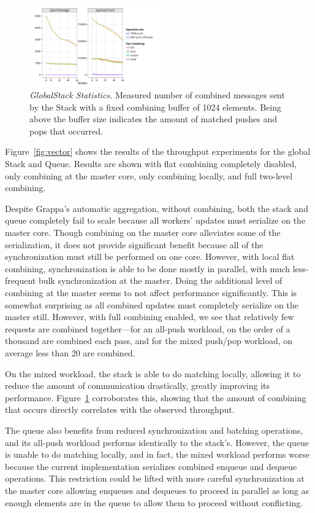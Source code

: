\begin{figure}[t]
  \centering
  \includegraphics[width=0.5\textwidth]{data/plots/stack_stats.pdf}
  \caption{\emph{GlobalStack Statistics.}
    Measured number of combined messages sent by the Stack with a fixed combining buffer of 1024 elements. Being above the buffer size indicates the amount of matched pushes and pops that occurred.
  }
  \label{fig:stack_stats}
\end{figure}

Figure~\ref{fig:vector} shows the results of the throughput experiments for the global Stack and Queue. Results are shown with flat combining completely disabled, only combining at the master core, only combining locally, and full two-level combining.

Despite Grappa's automatic aggregation, without combining, both the stack and queue completely fail to scale because all workers' updates must serialize on the master core.
Though combining on the master core alleviates some of the serialization, it does not provide significant benefit because all of the synchronization must still be performed on one core. However, with local flat combining, synchronization is able to be done mostly in parallel, with much less-frequent bulk synchronization at the master. Doing the additional level of combining at the master seems to not affect performance significantly. This is somewhat surprising as all combined updates must completely serialize on the master still. However, with full combining enabled, we see that relatively few requests are combined together---for an all-push workload, on the order of a thousand are combined each pass, and for the mixed push/pop workload, on average less than 20 are combined.

On the mixed workload, the stack is able to do matching locally, allowing it to reduce the amount of communication drastically, greatly improving its performance. Figure~\ref{fig:stack_stats} corroborates this, showing that the amount of combining that occurs directly correlates with the observed throughput.

The queue also benefits from reduced synchronization and batching operations, and its all-push workload performs identically to the stack's.
However, the queue is unable to do matching locally, and in fact, the mixed workload performs worse because the current implementation serializes combined enqueue and dequeue operations. This restriction could be lifted with more careful synchronization at the master core allowing enqueues and dequeues to proceed in parallel as long as enough elements are in the queue to allow them to proceed without conflicting.

